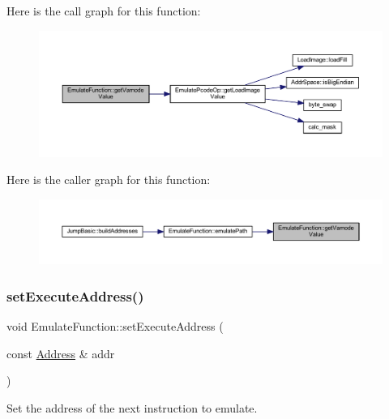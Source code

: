 Here is the call graph for this function\+:
\nopagebreak
\begin{figure}[H]
\begin{center}
\leavevmode
\includegraphics[width=350pt]{class_emulate_function_aea3a1fca2e8073ab6e7bcff5f05a74ca_cgraph}
\end{center}
\end{figure}
Here is the caller graph for this function\+:
\nopagebreak
\begin{figure}[H]
\begin{center}
\leavevmode
\includegraphics[width=350pt]{class_emulate_function_aea3a1fca2e8073ab6e7bcff5f05a74ca_icgraph}
\end{center}
\end{figure}
\mbox{\label{class_emulate_function_abdda883c4bab425f1c060fcc6c867b25}} 
\subsubsection{\texorpdfstring{setExecuteAddress()}{setExecuteAddress()}}
{\footnotesize\ttfamily void Emulate\+Function\+::set\+Execute\+Address (\begin{DoxyParamCaption}\item[{const \mbox{\hyperlink{class_address}{Address}} \&}]{addr }\end{DoxyParamCaption})\hspace{0.3cm}{\ttfamily [virtual]}}



Set the address of the next instruction to emulate. 



